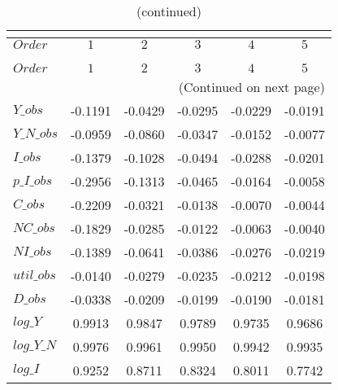  
\begin{center}
\begin{longtable}{lccccc} 
\caption{COEFFICIENTS OF AUTOCORRELATION}\\
 \label{Table:th_autocorr_matrix}\\
\toprule 
$Order      $	 & 	 $          1$	 & 	 $          2$	 & 	 $          3$	 & 	 $          4$	 & 	 $          5$\\
\midrule \endfirsthead 
\caption{(continued)}\\
 \toprule \\ 
$Order      $	 & 	 $          1$	 & 	 $          2$	 & 	 $          3$	 & 	 $          4$	 & 	 $          5$\\
\midrule \endhead 
\midrule \multicolumn{6}{r}{(Continued on next page)} \\ \bottomrule \endfoot 
\bottomrule \endlastfoot 
$Y\_obs     $	 & 	    -0.1191	 & 	    -0.0429	 & 	    -0.0295	 & 	    -0.0229	 & 	    -0.0191 \\ 
$Y\_N\_obs  $	 & 	    -0.0959	 & 	    -0.0860	 & 	    -0.0347	 & 	    -0.0152	 & 	    -0.0077 \\ 
$I\_obs     $	 & 	    -0.1379	 & 	    -0.1028	 & 	    -0.0494	 & 	    -0.0288	 & 	    -0.0201 \\ 
$p\_I\_obs  $	 & 	    -0.2956	 & 	    -0.1313	 & 	    -0.0465	 & 	    -0.0164	 & 	    -0.0058 \\ 
$C\_obs     $	 & 	    -0.2209	 & 	    -0.0321	 & 	    -0.0138	 & 	    -0.0070	 & 	    -0.0044 \\ 
$NC\_obs    $	 & 	    -0.1829	 & 	    -0.0285	 & 	    -0.0122	 & 	    -0.0063	 & 	    -0.0040 \\ 
$NI\_obs    $	 & 	    -0.1389	 & 	    -0.0641	 & 	    -0.0386	 & 	    -0.0276	 & 	    -0.0219 \\ 
$util\_obs  $	 & 	    -0.0140	 & 	    -0.0279	 & 	    -0.0235	 & 	    -0.0212	 & 	    -0.0198 \\ 
$D\_obs     $	 & 	    -0.0338	 & 	    -0.0209	 & 	    -0.0199	 & 	    -0.0190	 & 	    -0.0181 \\ 
$log\_Y     $	 & 	     0.9913	 & 	     0.9847	 & 	     0.9789	 & 	     0.9735	 & 	     0.9686 \\ 
$log\_Y\_N  $	 & 	     0.9976	 & 	     0.9961	 & 	     0.9950	 & 	     0.9942	 & 	     0.9935 \\ 
$log\_I     $	 & 	     0.9252	 & 	     0.8711	 & 	     0.8324	 & 	     0.8011	 & 	     0.7742 \\ 

\end{longtable}
\end{center}
